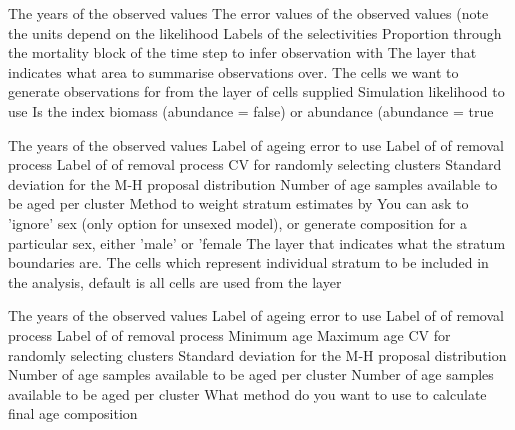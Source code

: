  {The years of the observed values}
 {The error values of the observed values (note the units depend on the likelihood}
 {Labels of the selectivities}
 {Proportion through the mortality block of the time step to infer observation with}
 {The layer that indicates what area to summarise observations over.}
 {The cells we want to generate observations for from the layer of cells supplied}
 {Simulation likelihood to use}
 {Is the index biomass (abundance = false) or abundance (abundance = true}
\par\textbf{}\par
{} {The years of the observed values}
 {Label of ageing error to use}
 {Label of of removal process}
 {Label of of removal process}
 {CV for randomly selecting clusters}
 {}
 {Standard deviation for the M-H proposal distribution}
 {Number of age samples available to be aged per cluster}
 {Method to weight stratum estimates by}
 {You can ask to 'ignore' sex (only option for unsexed model), or generate composition for a particular sex, either 'male' or 'female}
 {The layer that indicates what the stratum boundaries are.}
 {The cells which represent individual stratum to be included in the analysis, default is all cells are used from the layer}
\par\textbf{}\par
{} {The years of the observed values}
 {Label of ageing error to use}
 {Label of of removal process}
 {Label of of removal process}
 {Minimum age}
 {Maximum age}
 {CV for randomly selecting clusters}
 {Standard deviation for the M-H proposal distribution}
 {Number of age samples available to be aged per cluster}
 {Number of age samples available to be aged per cluster}
 {What method do you want to use to calculate final age composition}
